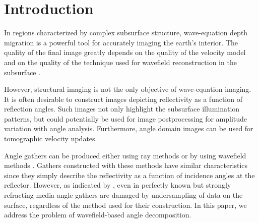 \section{Introduction}


In regions characterized by complex subsurface structure,
wave-equation depth migration is a powerful tool for accurately
imaging the earth's interior. The quality of the final image greatly
depends on the quality of the velocity model and on the quality of the
technique used for wavefield reconstruction in the subsurface
\cite[]{GEO66-05-16221640}.


However, structural imaging is not the only objective of wave-equation
imaging. It is often desirable to construct images depicting
reflectivity as a function of reflection angles. Such images not only
highlight the subsurface illumination patterns, but could potentially
be used for image postprocessing for amplitude variation with angle
analysis. Furthermore, angle domain images can be used for tomographic
velocity updates.


Angle gathers can be produced either using ray methods
\cite[]{SEG-1998-1538,GEO68-01-02320254} or by using wavefield methods
\cite[]{GEO55-09-12231234,SEG-1997-1379,SEG-1999-08240827,SEG-2002-13601363,RickettSava.geo.img,SavaFomel.geo.ang,GEO69-05-12831298,Wu.directionalIllumination}. Gathers
constructed with these methods have similar characteristics since they
simply describe the reflectivity as a function of incidence angles at
the reflector. However, as indicated by \cite{GEO69-02-05620575}, even
in perfectly known but strongly refracting media angle gathers are
damaged by undersampling of data on the surface, regardless of the
method used for their construction. In this paper, we address the
problem of wavefield-based angle decomposition.


